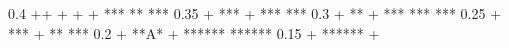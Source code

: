 \documentclass[letterpaper,10pt,english]{sphinxmanual}
\begin{document}
\begin{fulllineitems}
%
\begin{sphinxVerbatim}[commandchars=\\\{\}]
 0.4 +\PYGZhy{}\PYGZhy{}\PYGZhy{}\PYGZhy{}\PYGZhy{}\PYGZhy{}\PYGZhy{}\PYGZhy{}\PYGZhy{}\PYGZhy{}\PYGZhy{}\PYGZhy{}\PYGZhy{}\PYGZhy{}\PYGZhy{}\PYGZhy{}\PYGZhy{}\PYGZhy{}\PYGZhy{}\PYGZhy{}\PYGZhy{}\PYGZhy{}\PYGZhy{}\PYGZhy{}\PYGZhy{}\PYGZhy{}\PYGZhy{}\PYGZhy{}\PYGZhy{}\PYGZhy{}\PYGZhy{}\PYGZhy{}\PYGZhy{}\PYGZhy{}\PYGZhy{}\PYGZhy{}\PYGZhy{}\PYGZhy{}\PYGZhy{}\PYGZhy{}\PYGZhy{}\PYGZhy{}\PYGZhy{}\PYGZhy{}\PYGZhy{}\PYGZhy{}\PYGZhy{}\PYGZhy{}\PYGZhy{}\PYGZhy{}\PYGZhy{}\PYGZhy{}\PYGZhy{}\PYGZhy{}\PYGZhy{}\PYGZhy{}\PYGZhy{}\PYGZhy{}\PYGZhy{}\PYGZhy{}\PYGZhy{}\PYGZhy{}\PYGZhy{}\PYGZhy{}\PYGZhy{}\PYGZhy{}\PYGZhy{}\PYGZhy{}\PYGZhy{}\PYGZhy{}\PYGZhy{}\PYGZhy{}\PYGZhy{}\PYGZhy{}\PYGZhy{}\PYGZhy{}\PYGZhy{}\PYGZhy{}+
     \textbar{}                   +                   +                  +               *** \textbar{}
     \textbar{}                                                                        **    \textbar{}
     \textbar{}                                                                     ***      \textbar{}
0.35 \textbar{}\PYGZhy{}+                                                                ***       +\PYGZhy{}\textbar{}
     \textbar{}                                                               ***            \textbar{}
     \textbar{}                                                            ***               \textbar{}
 0.3 \textbar{}\PYGZhy{}+                                                        **                +\PYGZhy{}\textbar{}
     \textbar{}                                                       ***                    \textbar{}
     \textbar{}                                                    ***                       \textbar{}
     \textbar{}                                                 ***                          \textbar{}
0.25 \textbar{}\PYGZhy{}+                                            ***                           +\PYGZhy{}\textbar{}
     \textbar{}                                            **                                \textbar{}
     \textbar{}                                         ***                                  \textbar{}
 0.2 \textbar{}\PYGZhy{}+                                   **A*                                   +\PYGZhy{}\textbar{}
     \textbar{}                               ******                                         \textbar{}
     \textbar{}                         ******                                               \textbar{}
0.15 \textbar{}\PYGZhy{}+                 ******                                                   +\PYGZhy{}\textbar{}

\end{sphinxVerbatim}
\end{fulllineitems}
\end{document}
